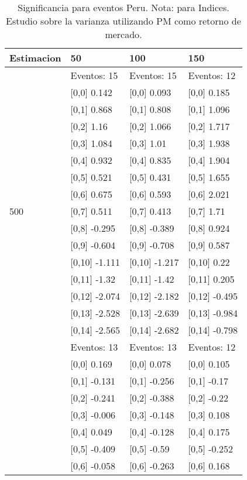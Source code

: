 \begin{table}

\caption{Significancia para eventos Peru. Nota: para Indices. Estudio sobre la varianza utilizando PM como retorno de mercado.}
\centering
\begin{tabular}[t]{llll}
\toprule
Estimacion & 50 & 100 & 150\\
\midrule
 & Eventos:  15 & Eventos:  15 & Eventos:  12\\
 & {}[0,0] 0.142 & {}[0,0] 0.093 & {}[0,0] 0.185\\
 & {}[0,1] 0.868 & {}[0,1] 0.808 & {}[0,1] 1.096\\
 & {}[0,2] 1.16 & {}[0,2] 1.066 & {}[0,2] 1.717\\
 & {}[0,3] 1.084 & {}[0,3] 1.01 & {}[0,3] 1.938\\
\addlinespace
 & {}[0,4] 0.932 & {}[0,4] 0.835 & {}[0,4] 1.904\\
 & {}[0,5] 0.521 & {}[0,5] 0.431 & {}[0,5] 1.655\\
 & {}[0,6] 0.675 & {}[0,6] 0.593 & {}[0,6] 2.021\\
500 & {}[0,7] 0.511 & {}[0,7] 0.413 & {}[0,7] 1.71\\
 & {}[0,8] -0.295 & {}[0,8] -0.389 & {}[0,8] 0.924\\
\addlinespace
 & {}[0,9] -0.604 & {}[0,9] -0.708 & {}[0,9] 0.587\\
 & {}[0,10] -1.111 & {}[0,10] -1.217 & {}[0,10] 0.22\\
 & {}[0,11] -1.32 & {}[0,11] -1.42 & {}[0,11] 0.205\\
 & {}[0,12] -2.074 & {}[0,12] -2.182 & {}[0,12] -0.495\\
 & {}[0,13] -2.528 & {}[0,13] -2.639 & {}[0,13] -0.984\\
\addlinespace
 & {}[0,14] -2.565 & {}[0,14] -2.682 & {}[0,14] -0.798\\
 & Eventos:  13 & Eventos:  13 & Eventos:  12\\
 & {}[0,0] 0.169 & {}[0,0] 0.078 & {}[0,0] 0.105\\
 & {}[0,1] -0.131 & {}[0,1] -0.256 & {}[0,1] -0.17\\
 & {}[0,2] -0.241 & {}[0,2] -0.388 & {}[0,2] -0.22\\
\addlinespace
 & {}[0,3] -0.006 & {}[0,3] -0.148 & {}[0,3] 0.108\\
 & {}[0,4] 0.049 & {}[0,4] -0.128 & {}[0,4] 0.175\\
 & {}[0,5] -0.409 & {}[0,5] -0.59 & {}[0,5] -0.252\\
 & {}[0,6] -0.058 & {}[0,6] -0.263 & {}[0,6] 0.168\\

\end{tabular}
\end{table}
